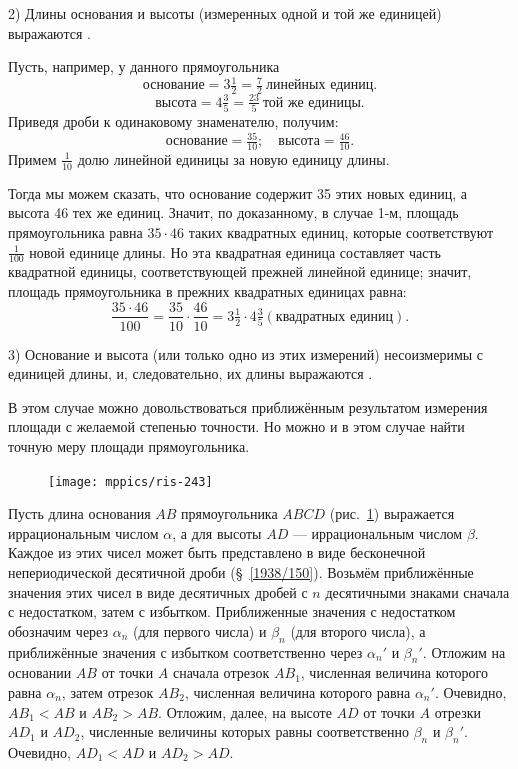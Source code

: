 \documentclass[oneside]{book}
\begin{document}
2) Длины основания и высоты (измеренных одной и той же единицей) выражаются .

Пусть, например, у данного прямоугольника
\[\text{основание} = 3\tfrac12=\tfrac72~\text{линейных единиц.}\]
\[\text{высота} = 4\tfrac35 = \tfrac{23}5~\text{той же единицы.}\]
Приведя дроби к одинаковому знаменателю, получим:
\[\text{основание} = \tfrac{35}{10};
\quad
\text{высота} = \tfrac{46}{10}.
\]
Примем $\tfrac1{10}$ долю линейной единицы за новую единицу длины.

Тогда мы можем сказать, что основание содержит 35 этих новых единиц, а высота 46 тех же единиц.
Значит, по доказанному, в случае 1-м, площадь прямоугольника равна $35 \cdot 46$ таких квадратных единиц, которые соответствуют $\tfrac1{100}$ новой единице длины.
Но эта квадратная единица составляет часть квадратной единицы, соответствующей прежней линейной единице;
значит, площадь прямоугольника в прежних квадратных единицах равна:
\[\frac{35\cdot 46}{100}=\frac{35}{10}\cdot\frac{46}{10}=3\tfrac12\cdot4\tfrac35(\text{квадратных единиц}).\]

3) Основание и высота (или только одно из этих измерений) несоизмеримы с единицей длины, и, следовательно, их длины выражаются .

В этом случае можно довольствоваться приближённым результатом измерения площади с желаемой степенью точности.
Но можно и в этом случае найти точную меру площади прямоугольника.

\begin{figure}
\centering
\texttt{[image: mppics/ris-243]}
\caption{}\label{1938/ris-243}
\end{figure}

Пусть длина основания $AB$ прямоугольника $ABCD$ (рис.~\ref{1938/ris-243}) выражается иррациональным числом $\alpha$, а для высоты $AD$ — иррациональным числом $\beta$.
Каждое из этих чисел может быть представлено в виде бесконечной непериодической десятичной дроби (§~\ref{1938/150}).
Возьмём приближённые значения этих чисел в виде десятичных дробей с $n$ десятичными знаками сначала с недостатком, затем с избытком.
Приближенные значения с недостатком обозначим через $\alpha_n$ (для первого числа) и $\beta_n$ (для второго числа), а приближённые значения с избытком соответственно через  $\alpha_n'$ и $\beta_n'$.
Отложим на основании $AB$ от точки $A$ сначала отрезок $AB_1$, численная величина которого равна $\alpha_n$, затем отрезок $AB_2$, численная величина которого равна  $\alpha_n'$.
Очевидно, $AB_1<AB$ и $AB_2>AB$.
Отложим, далее, на высоте $AD$ от точки $A$ отрезки $AD_1$ и $AD_2$, численные величины которых равны соответственно $\beta_n$ и $\beta_n'$.
Очевидно, $AD_1<AD$ и $AD_2>AD$.
\end{document}

